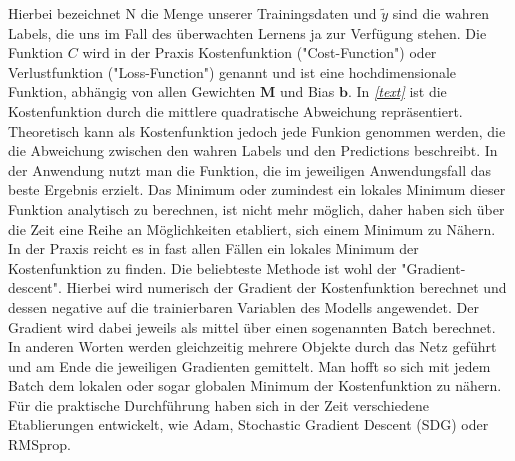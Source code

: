Hierbei bezeichnet N die Menge unserer Trainingsdaten und $\tilde{y}$ sind die wahren Labels, die uns im Fall des überwachten Lernens ja zur Verfügung stehen. Die Funktion $C$ wird in der Praxis Kostenfunktion ("Cost-Function") oder Verlustfunktion ("Loss-Function") genannt und ist eine hochdimensionale Funktion, abhängig von allen Gewichten $\mathbf{M}$ und Bias $\mathbf{b}$. In \textit{\autoref{text}} ist die Kostenfunktion durch die mittlere quadratische Abweichung repräsentiert. Theoretisch kann als Kostenfunktion jedoch jede Funkion genommen werden, die die Abweichung zwischen den wahren Labels und den Predictions beschreibt. In der Anwendung nutzt man die Funktion, die im jeweiligen Anwendungsfall das beste Ergebnis erzielt. Das Minimum  oder zumindest ein lokales Minimum dieser Funktion analytisch zu berechnen, ist nicht mehr möglich, daher haben sich über die Zeit eine Reihe an Möglichkeiten etabliert, sich einem Minimum zu Nähern. In der Praxis reicht es in fast allen Fällen ein lokales Minimum der Kostenfunktion zu finden. Die beliebteste Methode ist wohl der "Gradient-descent". Hierbei wird numerisch der Gradient der Kostenfunktion berechnet und dessen negative auf die trainierbaren Variablen des Modells angewendet. Der Gradient wird dabei jeweils als mittel über einen sogenannten Batch berechnet. In anderen Worten werden gleichzeitig mehrere Objekte durch das Netz geführt und am Ende die jeweiligen Gradienten gemittelt. Man hofft so sich mit jedem Batch dem lokalen oder sogar globalen Minimum der Kostenfunktion zu nähern. Für die praktische Durchführung haben sich in der Zeit verschiedene Etablierungen entwickelt, wie Adam, Stochastic Gradient Descent (SDG) oder RMSprop. 

